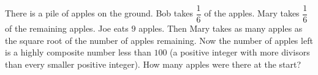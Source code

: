 There is a pile of apples on the ground. Bob takes $\dfrac16$ of the apples. Mary takes $\dfrac16$ of the remaining apples. Joe eats $9$ apples. Then Mary takes as many apples as the square root of the number of apples remaining. Now the number of apples left is a highly composite number less than $100$ (a positive integer with more divisors than every smaller positive integer). How many apples were there at the start?
